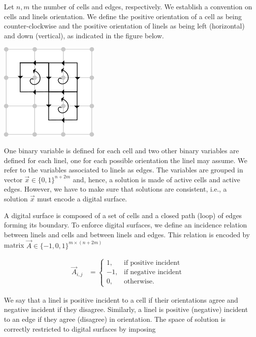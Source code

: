 Let $n,m$ the number of cells and edges, respectively. We establish a convention on cells and linels orientation. We define the positive orientation of a cell as being counter-clockwise and the positive orientation of linels as being left (horizontal) and down (vertical), as indicated in the figure below. 

\begin{center}
\includegraphics[scale=0.6]{figures/chapter3/schoenemann/schoenemann_cell_linel_orientation.png}
\end{center}

One binary variable is defined for each cell and two other binary variables are defined for each linel, one for each possible orientation the linel may assume. We refer to the variables associated to linels as edges. The variables are grouped in vector $\vec{x} \in \{0,1\}^{n+2m}$ and, hence, a solution is made of active cells and active edges. However, we have to make sure that solutions are consistent, i.e., a solution $\vec{x}$ must encode a digital surface. 

A digital surface is composed of a set of cells and a closed path (loop) of edges forming its boundary. To enforce digital surfaces, we define an incidence relation between linels and cells and between linels and edges. This relation is encoded by matrix $\vec{A} \in \{-1,0,1\}^{m\times(n+2m)}$ 

\begin{align*}
	\vec{A}_{i,j} &= \left\{ \begin{array}{rl}
		1,& \text{if positive incident}\\
		-1,& \text{if negative incident}\\
		0,& \text{otherwise}.		
	\end{array}\right.
\end{align*}

We say that a linel is positive incident to a cell if their orientations agree and negative incident if they disagree. Similarly, a linel is positive (negative) incident to an edge if they agree (disagree) in orientation. The space of solution is correctly restricted to digital surfaces by imposing

